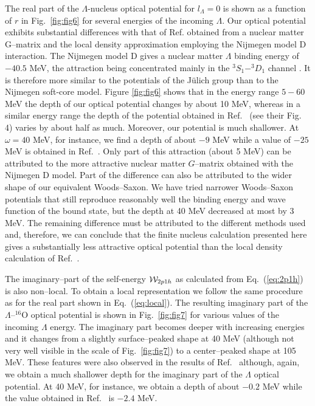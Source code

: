 The real part of the
$\Lambda$-nucleus optical potential for $l_\Lambda=0$ is
shown as a function of $r$ in Fig.\ \ref{fig:fig6} for several energies
of the incoming $\Lambda$.
Our optical potential exhibits substantial differences with that
of Ref.  \cite{bando2} obtained from a nuclear matter G--matrix and the
local density approximation employing the Nijmegen model D
interaction. The Nijmegen model D gives a nuclear matter $\Lambda$
binding energy of $-40.5$ MeV, the attraction being concentrated
mainly in the $^3S_1-^3D_1$ channel \cite{yamamoto}. It is therefore
more similar
to the potentials of the J\"ulich group than to the Nijmegen soft-core
model.
Figure \ref{fig:fig6} shows that in the energy range $5-60$ MeV the depth
of our optical potential changes by about 10 MeV, whereas in a
similar energy range the depth of the potential obtained in
Ref.\  \cite{bando2} (see their Fig. 4) varies by about half as much.
Moreover, our potential is much shallower. At
$\omega=40$ MeV, for instance, we find a depth of about $-9$ MeV while
a value of $-25$ MeV is obtained in Ref.\  \cite{bando2}. Only part of
this attraction (about 5 MeV) can be attributed to the more
attractive nuclear
matter $G$--matrix obtained with the Nijmegen D model. Part of the
difference can also be attributed to the wider shape of our
equivalent Woods--Saxon. We have tried narrower Woods--Saxon potentials
that still
reproduce reasonably well the binding energy and wave function of the
bound state, but the depth at 40 MeV decreased at most by 3
MeV.
The remaining difference must be attributed to the different methods
used and, therefore, we can conclude that the finite nucleus
calculation presented here gives a substantially less attractive
optical potential than the local density calculation of Ref.\
 \cite{bando2}.

The imaginary--part of the self-energy ${\cal W}_{2p1h}$ as calculated
from Eq.\ (\ref{eq:2p1h}) is also non--local. To obtain a local
representation we follow the same procedure as for the real part
shown in Eq.\ (\ref{eq:local}).
The resulting imaginary part of the $\Lambda$--$^{16}$O optical
potential
is shown in Fig.\ \ref{fig:fig7} for various values of the incoming
$\Lambda$ energy. The imaginary part becomes deeper with increasing
energies and it changes from a slightly surface--peaked shape at
40 MeV (although not very well visible in the scale of Fig.\
\ref{fig:fig7}) to a center--peaked shape at 105 MeV. These features
were also observed in the results of Ref.\  \cite{bando2}
although, again,
we obtain a much shallower depth for the imaginary part of
the $\Lambda$ optical potential.
At 40 MeV, for instance, we obtain a depth of about $-0.2$ MeV while
the value obtained in Ref.\  \cite{bando2} is $-2.4$ MeV.

